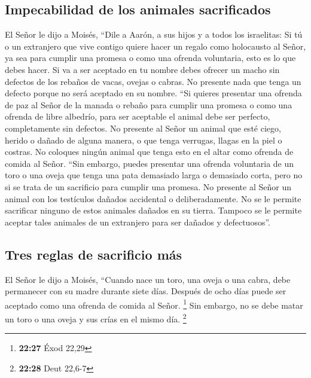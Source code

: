 \hypertarget{impecabilidad-de-los-animales-sacrificados}{%
\subsection{Impecabilidad de los animales
sacrificados}\label{impecabilidad-de-los-animales-sacrificados}}

 El Señor le dijo a Moisés,  ``Dile a
Aarón, a sus hijos y a todos los israelitas: Si tú o un extranjero que
vive contigo quiere hacer un regalo como holocausto al Señor, ya sea
para cumplir una promesa o como una ofrenda voluntaria, esto es lo que
debes hacer.  Si va a ser aceptado en tu nombre debes
ofrecer un macho sin defectos de los rebaños de vacas, ovejas o cabras.
 No presente nada que tenga un defecto porque no será
aceptado en su nombre.  ``Si quieres presentar una
ofrenda de paz al Señor de la manada o rebaño para cumplir una promesa o
como una ofrenda de libre albedrío, para ser aceptable el animal debe
ser perfecto, completamente sin defectos.  No presente al
Señor un animal que esté ciego, herido o dañado de alguna manera, o que
tenga verrugas, llagas en la piel o costras. No coloques ningún animal
que tenga esto en el altar como ofrenda de comida al Señor.
 ``Sin embargo, puedes presentar una ofrenda voluntaria
de un toro o una oveja que tenga una pata demasiado larga o demasiado
corta, pero no si se trata de un sacrificio para cumplir una promesa.
 No presente al Señor un animal con los testículos
dañados accidental o deliberadamente. No se le permite sacrificar
ninguno de estos animales dañados en su tierra.  Tampoco
se le permite aceptar tales animales de un extranjero para ser dañados y
defectuosos''.

\hypertarget{tres-reglas-de-sacrificio-muxe1s}{%
\subsection{Tres reglas de sacrificio
más}\label{tres-reglas-de-sacrificio-muxe1s}}

 El Señor le dijo a Moisés,  ``Cuando nace
un toro, una oveja o una cabra, debe permanecer con su madre durante
siete días. Después de ocho días puede ser aceptado como una ofrenda de
comida al Señor. \footnote{\textbf{22:27} Éxod 22,29} 
Sin embargo, no se debe matar un toro o una oveja y sus crías en el
mismo día. \footnote{\textbf{22:28} Deut 22,6-7}

